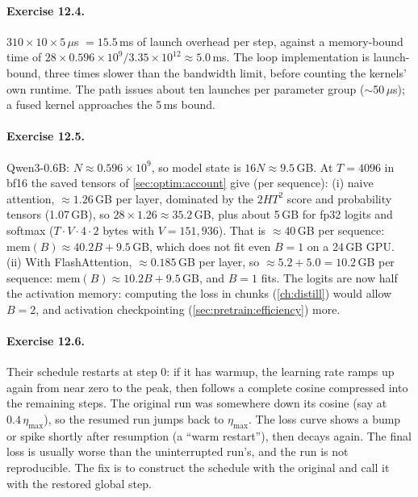 \paragraph{Exercise 12.4.} $310\times10\times5\,\mu$s $=15.5$\,ms of launch overhead per step,
against a memory-bound time of $28\times0.596\times10^9/3.35\times10^{12}\approx5.0$\,ms. The loop
implementation is launch-bound, three times slower than the bandwidth limit, before counting the
kernels' own runtime. The  path issues about ten launches per parameter group
($\sim$50\,$\mu$s); a fused kernel approaches the 5\,ms bound.

\paragraph{Exercise 12.5.} Qwen3-0.6B: $N\approx0.596\times10^9$, so model state is $16N\approx9.5$\,GB.
At $T=4096$ in bf16 the saved tensors of \cref{sec:optim:account} give (per sequence):
(i) naive attention, $\approx1.26$\,GB per layer, dominated by the $2HT^2$ score and probability
tensors (1.07\,GB), so $28\times1.26\approx35.2$\,GB, plus about 5\,GB for fp32 logits and softmax
($T\cdot V\cdot4\cdot2$ bytes with $V=151{,}936$). That is $\approx40$\,GB per sequence:
$\text{mem}(B)\approx40.2B+9.5$\,GB, which does not fit even $B=1$ on a 24\,GB GPU. (ii) With
FlashAttention, $\approx0.185$\,GB per layer, so $\approx5.2+5.0=10.2$\,GB per sequence:
$\text{mem}(B)\approx10.2B+9.5$\,GB, and $B=1$ fits. The logits are now half the activation memory:
computing the loss in chunks (\cref{ch:distill}) would allow $B=2$, and activation
checkpointing (\cref{sec:pretrain:efficiency}) more.

\paragraph{Exercise 12.6.} Their schedule restarts at step 0: if it has warmup, the learning rate
ramps up again from near zero to the peak, then follows a complete cosine compressed into the
remaining steps. The original run was somewhere down its cosine (say at $0.4\,\eta_{\max}$),
so the resumed run jumps back to $\eta_{\max}$. The loss curve shows a bump or spike shortly
after resumption (a ``warm restart''), then decays again. The final loss is usually worse than the
uninterrupted run's, and the run is not reproducible. The fix is to construct the schedule with the
original  and call it with the restored global step.

